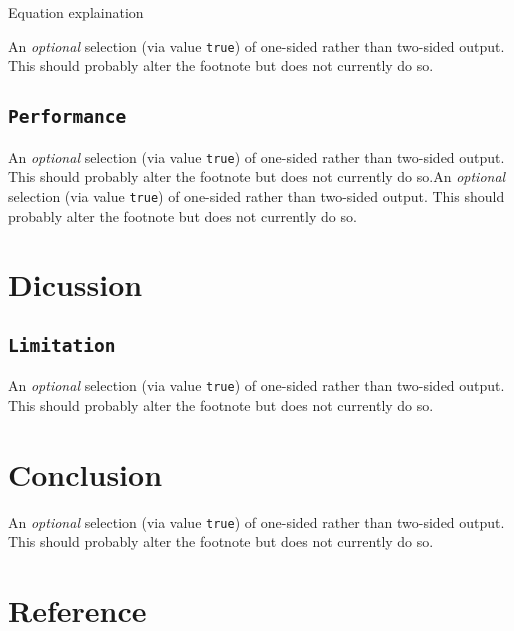 \documentclass[letterpaper,9pt,twocolumn,twoside,]{pinp}
\begin{document}
Equation explaination

An \emph{optional} selection (via value \texttt{true}) of one-sided
rather than two-sided output. This should probably alter the footnote
but does not currently do so.

\hypertarget{performance}{%
\subsection{\texorpdfstring{\texttt{Performance}}{Performance}}\label{performance}}

An \emph{optional} selection (via value \texttt{true}) of one-sided
rather than two-sided output. This should probably alter the footnote
but does not currently do so.An \emph{optional} selection (via value
\texttt{true}) of one-sided rather than two-sided output. This should
probably alter the footnote but does not currently do so.

\hypertarget{dicussion}{%
\section{Dicussion}\label{dicussion}}

\hypertarget{limitation}{%
\subsection{\texorpdfstring{\texttt{Limitation}}{Limitation}}\label{limitation}}

An \emph{optional} selection (via value \texttt{true}) of one-sided
rather than two-sided output. This should probably alter the footnote
but does not currently do so.

\hypertarget{conclusion}{%
\section{Conclusion}\label{conclusion}}

An \emph{optional} selection (via value \texttt{true}) of one-sided
rather than two-sided output. This should probably alter the footnote
but does not currently do so.

\hypertarget{reference}{%
\section{Reference}\label{reference}}

\showacknow
\end{document}
